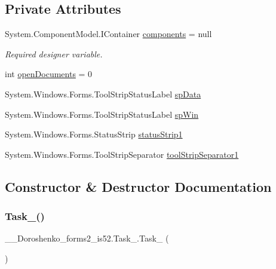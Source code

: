 \subsection*{Private Attributes}
\begin{DoxyCompactItemize}
\item 
System.\+Component\+Model.\+I\+Container \hyperlink{class__7___doroshenko__forms2__is52_1_1_task__4_af767a3c792f693be7008e66f7c778996}{components} = null
\begin{DoxyCompactList}\small\item\em Required designer variable. \end{DoxyCompactList}\item 
int \hyperlink{class__7___doroshenko__forms2__is52_1_1_task__4_a7fa9d2f8fb84e0961cead6f2e84aafd8}{open\+Documents} = 0
\item 
System.\+Windows.\+Forms.\+Tool\+Strip\+Status\+Label \hyperlink{class__7___doroshenko__forms2__is52_1_1_task__4_a80965611537e59531ab5c2dff360bbd9}{sp\+Data}
\item 
System.\+Windows.\+Forms.\+Tool\+Strip\+Status\+Label \hyperlink{class__7___doroshenko__forms2__is52_1_1_task__4_a03eaf3f7b05cbf901c79e0018d5ecedb}{sp\+Win}
\item 
System.\+Windows.\+Forms.\+Status\+Strip \hyperlink{class__7___doroshenko__forms2__is52_1_1_task__4_acd6679daf848f18b9e9905842416eb6a}{status\+Strip1}
\item 
System.\+Windows.\+Forms.\+Tool\+Strip\+Separator \hyperlink{class__7___doroshenko__forms2__is52_1_1_task__4_aaec220fabcd56417d4188ebbb1ee1ab6}{tool\+Strip\+Separator1}
\end{DoxyCompactItemize}


\subsection{Constructor \& Destructor Documentation}
\hypertarget{class__7___doroshenko__forms2__is52_1_1_task__4_ab407149ae7de6eea3e2107c0c264b49d}{}\label{class__7___doroshenko__forms2__is52_1_1_task__4_ab407149ae7de6eea3e2107c0c264b49d} 
\subsubsection{\texorpdfstring{Task\+\_()}{Task\_4()}}
{\footnotesize\ttfamily \+\_\+\_\+\+Doroshenko\+\_\+forms2\+\_\+is52.\+Task\+\_.\+Task\+\_ (\begin{DoxyParamCaption}{ }\end{DoxyParamCaption})}

